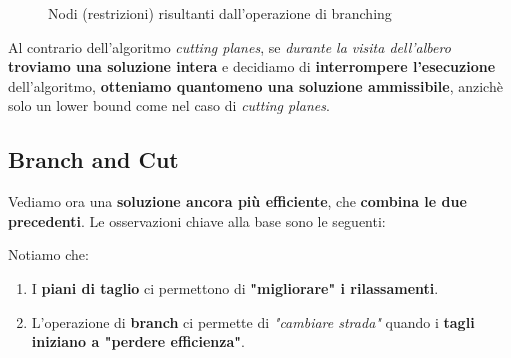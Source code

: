 \begin{figure}[!ht]
    \centering
    \caption{Nodi (restrizioni) risultanti dall'operazione di branching}
    \label{fig:04_05_MIP_BranchTree}
\end{figure}

\begin{remark}
    Al contrario dell'algoritmo \textit{cutting planes}, se \textit{durante la visita dell'albero}
    \textbf{troviamo una soluzione intera} e decidiamo di \textbf{interrompere l'esecuzione} 
    dell'algoritmo, \textbf{otteniamo quantomeno una soluzione ammissibile}, anzichè
    solo un lower bound come nel caso di \textit{cutting planes}.
\end{remark}

\subsection{Branch and Cut}

Vediamo ora una \textbf{soluzione ancora più efficiente}, che \textbf{combina le due precedenti}. 
Le osservazioni chiave alla base sono le seguenti:

\begin{remark}
    Notiamo che:
    \begin{enumerate}
        \item I \textbf{piani di taglio} ci permettono di \textbf{"migliorare" i rilassamenti}.
        \item L'operazione di \textbf{branch} ci permette di \textit{"cambiare strada"}
            quando i \textbf{tagli iniziano a "perdere efficienza"}.
    \end{enumerate}
\end{remark}

